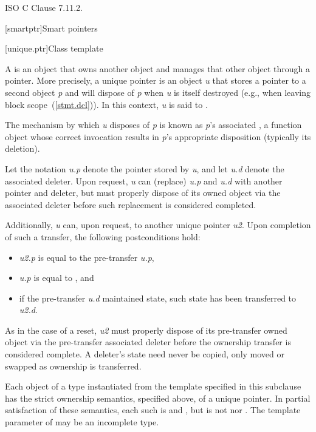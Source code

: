 \xref
ISO C Clause 7.11.2.

[smartptr]{Smart pointers}

[unique.ptr]{Class template }

\pnum
A  is an object that owns another object and
manages that other object through a pointer. More precisely, a unique pointer
is an object \textit{u} that stores a pointer to a second object \textit{p} and
will dispose of \textit{p} when \textit{u} is itself destroyed (e.g., when
leaving block scope~(\ref{stmt.dcl})). In this context, \textit{u} is said
to  .

\pnum
The mechanism by which \textit{u} disposes of \textit{p} is known as
\textit{p}'s associated , a function object whose correct
invocation results in \textit{p}'s appropriate disposition (typically its deletion).

\pnum
Let the notation \textit{u.p} denote the pointer stored by \textit{u}, and
let \textit{u.d} denote the associated deleter. Upon request, \textit{u} can
 (replace) \textit{u.p} and \textit{u.d} with another pointer and
deleter, but must properly dispose of its owned object via the associated
deleter before such replacement is considered completed.

\pnum
Additionally, \textit{u} can, upon request,  to another
unique pointer \textit{u2}. Upon completion of such a transfer, the following
postconditions hold:

\begin{itemize}
\item \textit{u2.p} is equal to the pre-transfer \textit{u.p},
\item \textit{u.p} is equal to , and
\item if the pre-transfer \textit{u.d} maintained state, such state has been
transferred to \textit{u2.d}.
\end{itemize}

As in the case of a reset, \textit{u2} must properly dispose of its pre-transfer
owned object via the pre-transfer associated deleter before the ownership
transfer is considered complete. \enternote A deleter's state need never be
copied, only moved or swapped as ownership is transferred. \exitnote

\pnum
Each object of a type  instantiated from the  template
specified in this subclause has the strict ownership semantics, specified above,
of a unique pointer. In partial satisfaction of these semantics, each such 
is  and , but is not
 nor .
The template parameter  of  may be an incomplete type.

